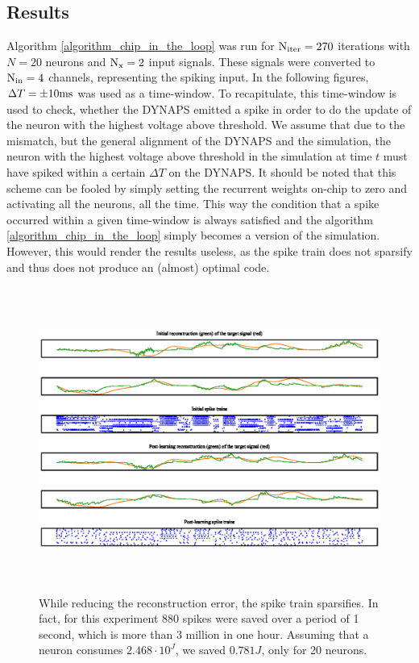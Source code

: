 \documentclass[twoside,11pt]{article}
\begin{document}
\subsection{Results}

Algorithm \ref{algorithm_chip_in_the_loop} was run for $\textnormal{N}_{\textnormal{iter}} = 270$ iterations
with $N = 20$ neurons and $\textnormal{N}_\textnormal{x} = 2$ input signals.
These signals were converted to $\textnormal{N}_{\textnormal{in}} = 4$ channels, representing the
spiking input. In the following figures, $\Delta T = \pm 10 \textnormal{ms}$ was used as a time-window.
To recapitulate, this time-window is used to check, whether the DYNAPS emitted a spike in order
to do the update of the neuron with the highest voltage above threshold. We assume that due to
the mismatch, but the general alignment of the DYNAPS and the simulation, the neuron with
the highest voltage above threshold in the simulation at time $t$ must have
spiked within a certain $\Delta T$ on the DYNAPS.
It should be noted that this scheme can be fooled by simply setting the recurrent weights on-chip
to zero and activating all the neurons, all the time. This way the condition that a spike occurred
within a given time-window is always satisfied and the algorithm \ref{algorithm_chip_in_the_loop}
simply becomes a version of the simulation. However, this would render the results useless, as
the spike train does not sparsify and thus does not produce an (almost) optimal code. \\


\begin{figure}[!htb]
  \centering
  \includegraphics[width = \columnwidth, height=10cm]{figures/DYNAPS_reconstruction.eps}
  \caption{While reducing the reconstruction error, the spike train sparsifies.
  In fact, for this experiment 880 spikes were saved over a period of 1 second, which is more
  than 3 million in one hour. Assuming that a neuron consumes
  $2.468 \cdot 10^ J$, we saved $0.781 J$, only for 20 neurons.}
  \label{fig:DYNAPS_reconstruction}
\end{figure}
\end{document}
